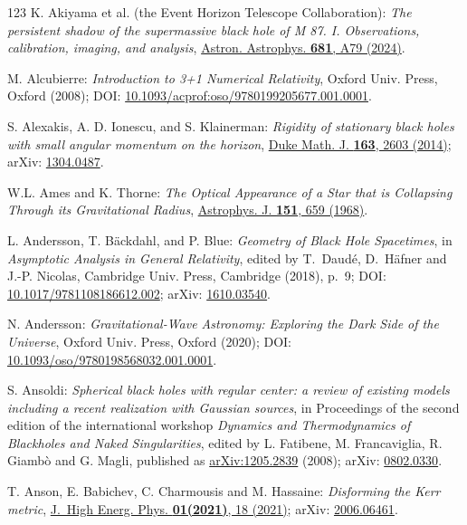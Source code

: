\begin{thebibliography}{123}
K. Akiyama et al. (the Event Horizon Telescope Collaboration):
{\em The persistent shadow of the supermassive black hole of M 87.
I. Observations, calibration, imaging, and analysis},
\href{https://doi.org/10.1051/0004-6361/202347932}{Astron. Astrophys. {\bf 681}, A79 (2024)}.

M. Alcubierre:
{\em Introduction to 3+1 Numerical Relativity},
Oxford Univ. Press, Oxford (2008);
DOI: \href{https://doi.org/10.1093/acprof:oso/9780199205677.001.0001}{10.1093/acprof:oso/9780199205677.001.0001}.

S. Alexakis, A. D. Ionescu, and S. Klainerman: {\em Rigidity of stationary black holes with small angular momentum on the horizon},
\href{https://doi.org/10.1215/00127094-2819517}{Duke Math. J. {\bf 163}, 2603 (2014)};
arXiv: \href{https://arxiv.org/abs/1304.0487}{1304.0487}.

W.L. Ames and K. Thorne:
{\em The Optical Appearance of a Star that is Collapsing Through its Gravitational Radius},
\href{https://doi.org/10.1086/149465}{Astrophys. J. {\bf 151}, 659 (1968)}.

L. Andersson, T. Bäckdahl, and P. Blue:
{\em Geometry of Black Hole Spacetimes},
in {\em Asymptotic Analysis in General Relativity}, edited by
T.~Daudé, D.~Häfner and J.-P. Nicolas,
Cambridge Univ. Press, Cambridge (2018), p.~9;
DOI: \href{https://doi.org/10.1017/9781108186612.002}{10.1017/9781108186612.002};
arXiv: \href{https://arxiv.org/abs/1610.03540}{1610.03540}.

N. Andersson:
{\em Gravitational-Wave Astronomy: Exploring the Dark Side of the Universe},
Oxford Univ. Press, Oxford (2020);
DOI: \href{https://doi.org/10.1093/oso/9780198568032.001.0001}{10.1093/oso/9780198568032.001.0001}.

S. Ansoldi:
{\em Spherical black holes with regular center: a review of existing models including a recent realization with Gaussian sources},
in Proceedings of the second edition of the international workshop \emph{Dynamics and Thermodynamics of Blackholes and Naked Singularities}, edited by L. Fatibene, M. Francaviglia, R. Giambò and G. Magli,
published as \href{https://arxiv.org/abs/1205.2839}{arXiv:1205.2839}
(2008);
arXiv: \href{https://arxiv.org/abs/0802.0330}{0802.0330}.

T. Anson, E. Babichev, C. Charmousis and M. Hassaine:
{\em Disforming the Kerr metric},
\href{https://doi.org/10.1007/JHEP01(2021)018}{J.~High Energ. Phys. {\bf 01(2021)}, 18 (2021)};
arXiv: \href{https://arxiv.org/abs/2006.06461}{2006.06461}.


\end{thebibliography}
